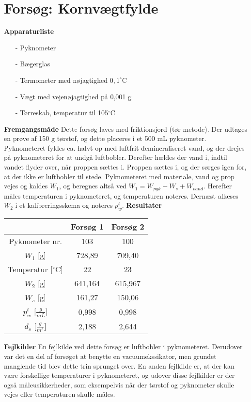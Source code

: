 \chapter{Forsøg: Kornvægtfylde}

\textbf{Apparaturliste}
\begin{itemize}
\item[-] Pyknometer
\item[-] Bægerglas
\item[-] Termometer med nøjagtighed $0,\!1^{\circ}$C
\item[-] Vægt med vejenøjagtighed på 0,001 g
\item[-] Tørreskab, temperatur til 105$^{\circ}$C
\end{itemize}

\textbf{Fremgangsmåde}
\newline
Dette forsøg laves med friktionsjord (tør metode). Der udtages en prøve af 150 g tørstof, og dette placeres i et 500 mL pyknometer. Pyknometeret fyldes ca. halvt op med luftfrit demineraliseret vand, og der drejes på pyknometeret for at undgå luftbobler. Derefter hældes der vand i, indtil vandet flyder over, når proppen sættes i. Proppen sættes i, og der sørges igen for, at der ikke er luftbobler til stede. Pyknometeret med materiale, vand og prop vejes og kaldes $W_{1}$, og beregnes altså ved $W_1 = W_{pyk} + W_s + W_{vand}$. Herefter måles temperaturen i pyknometeret, og temperaturen noteres. Dernæst aflæses $W_{2}$ i et kalibreringsskema og noteres $p_w^t$.
\newline
\newline
\textbf{Resultater}
\begin{center}
	\begin{tabular}{ |c|c|c| } 
		\hline
		 & Forsøg 1 & Forsøg 2 \\	\hline
		Pyknometer nr. & 103 & 100 \\	\hline
		$W_1$ [g] & 728,89 & 709,40 \\	\hline 
		Temperatur [$^{\circ}$C] & 22 & 23 \\ \hline
		$W_2$ [g] & 641,164 & 615,967 \\	\hline
		$W_s$ [g] & 161,27 & 150,06 \\	\hline
		$p_{w}^t$ [$\frac{g}{mL}$] & 0,998 & 0,998 \\	\hline
		$d_s$ [$\frac{g}{m^3}$] & 2,188 & 2,644	\\	\hline	
	\end{tabular}
\end{center}

\textbf{Fejlkilder}
\newline
En fejlkilde ved dette forsøg er luftbobler i pyknometeret. Derudover var det en del af forsøget at benytte en vacuumekssikator, men grundet manglende tid blev dette trin sprunget over. En anden fejlkilde er, at der kan være forskellige temperaturer i pyknometeret, og udover disse fejlkilder er der også måleusikkerheder, som eksempelvis når der tørstof og pyknometer skulle vejes eller temperaturen skulle måles.